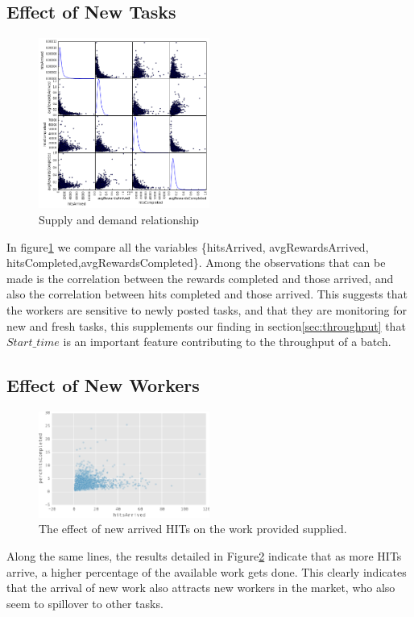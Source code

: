 \subsection{Effect of New Tasks}
\begin{figure}[htbp]
	\centering
		\includegraphics[width=0.5\textwidth]{figures/scattermatrix}
	\caption{Supply and demand relationship}
	\label{fig:scatter_matrix}
\end{figure}
In figure\ref{fig:scatter_matrix} we compare all the variables \{hitsArrived, avgRewardsArrived, hitsCompleted,avgRewardsCompleted\}. Among the observations that can be made is the correlation between the rewards completed and those arrived, and also the correlation between hits completed and those arrived. This suggests that the workers are sensitive to newly posted tasks, and that they are monitoring for new and fresh tasks, this supplements our finding in section\ref{sec:throughput} that $Start\_time$ is an important feature contributing to the throughput of a batch.

\subsection{Effect of New Workers}
\begin{figure}[htbp]
	\centering
		\includegraphics[width=0.5\textwidth]{figures/percHitsCompleted}
	\caption{The effect of new arrived HITs on the work provided supplied.}
	\label{fig:perc_hits_completed}
\end{figure}
Along the same lines, the results detailed in Figure\ref{fig:perc_hits_completed} indicate that as more HITs arrive, a higher percentage of the available work gets done. 
This clearly indicates that the arrival of new work also attracts new workers
in the market, who also seem to spillover to other tasks.

